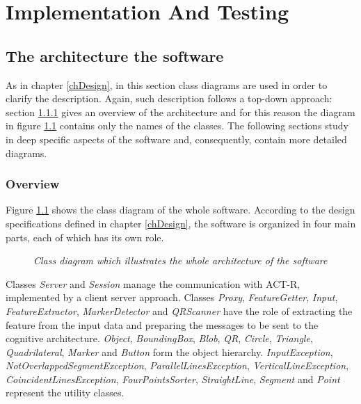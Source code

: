 \chapter{Implementation And Testing}

	\section{The architecture the software}
	As in chapter \ref{chDesign}, in this section class diagrams are used in order to clarify the description. Again, such description follows a top-down approach: section \ref{impl_arch} gives an overview of the architecture and for this reason the diagram in figure \ref{fig:implementation_names} contains only the names of the classes. The following sections study in deep specific aspects of the software and, consequently, contain more detailed diagrams.

	\subsection{Overview}\label{impl_arch}
	Figure \ref{fig:implementation_names} shows the class diagram of the whole software. 
	According to the design specifications defined in chapter \ref{chDesign}, the software is organized in four main parts, each of which has its own role.

	\begin{figure}[h]
	  \begin{center} 
	  \end{center} 
	  \caption{\textit{Class diagram which illustrates the whole architecture of the software}}  
	  \label{fig:implementation_names}
 	\end{figure}
 
	Classes \emph{Server} and \emph{Session} manage the communication with \mbox{ACT-R}, implemented by a client server approach.
	Classes \emph{Proxy}, \emph{FeatureGetter}, \emph{Input}, \emph{FeatureExtractor}, \emph{MarkerDetector} and \emph{QRScanner} have the role of extracting the feature from the input data and preparing the messages to be sent to the cognitive architecture.
	\emph{Object}, \emph{BoundingBox}, \emph{Blob}, \emph{QR}, \emph{Circle}, \emph{Triangle}, \emph{Quadrilateral}, \emph{Marker} and \emph{Button} form the object hierarchy.
	\emph{InputException}, \emph{NotOverlappedSegmentException}, \emph{ParallelLinesException}, \emph{VerticalLineException}, \emph{CoincidentLinesException}, \emph{FourPointsSorter}, \emph{StraightLine}, \emph{Segment} and \emph{Point} represent the utility classes.
	
